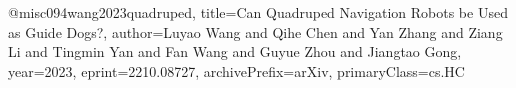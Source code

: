 @misc{094wang2023quadruped,
title={Can Quadruped Navigation Robots be Used as Guide Dogs?}, 
author={Luyao Wang and Qihe Chen and Yan Zhang and Ziang Li and Tingmin Yan and Fan Wang and Guyue Zhou and Jiangtao Gong},
year={2023},
eprint={2210.08727},
archivePrefix={arXiv},
primaryClass={cs.HC}
}